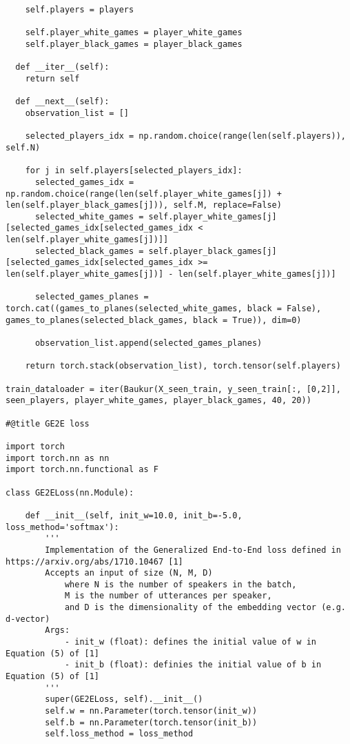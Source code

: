 \begin{verbatim}
    self.players = players

    self.player_white_games = player_white_games
    self.player_black_games = player_black_games

  def __iter__(self):
    return self

  def __next__(self):
    observation_list = []

    selected_players_idx = np.random.choice(range(len(self.players)), self.N)

    for j in self.players[selected_players_idx]:
      selected_games_idx = np.random.choice(range(len(self.player_white_games[j]) + len(self.player_black_games[j])), self.M, replace=False)
      selected_white_games = self.player_white_games[j][selected_games_idx[selected_games_idx < len(self.player_white_games[j])]]
      selected_black_games = self.player_black_games[j][selected_games_idx[selected_games_idx >= len(self.player_white_games[j])] - len(self.player_white_games[j])]

      selected_games_planes = torch.cat((games_to_planes(selected_white_games, black = False), games_to_planes(selected_black_games, black = True)), dim=0)

      observation_list.append(selected_games_planes)

    return torch.stack(observation_list), torch.tensor(self.players)

train_dataloader = iter(Baukur(X_seen_train, y_seen_train[:, [0,2]], seen_players, player_white_games, player_black_games, 40, 20))

#@title GE2E loss

import torch
import torch.nn as nn
import torch.nn.functional as F

class GE2ELoss(nn.Module):

    def __init__(self, init_w=10.0, init_b=-5.0, loss_method='softmax'):
        '''
        Implementation of the Generalized End-to-End loss defined in https://arxiv.org/abs/1710.10467 [1]
        Accepts an input of size (N, M, D)
            where N is the number of speakers in the batch,
            M is the number of utterances per speaker,
            and D is the dimensionality of the embedding vector (e.g. d-vector)
        Args:
            - init_w (float): defines the initial value of w in Equation (5) of [1]
            - init_b (float): definies the initial value of b in Equation (5) of [1]
        '''
        super(GE2ELoss, self).__init__()
        self.w = nn.Parameter(torch.tensor(init_w))
        self.b = nn.Parameter(torch.tensor(init_b))
        self.loss_method = loss_method


\end{verbatim}
